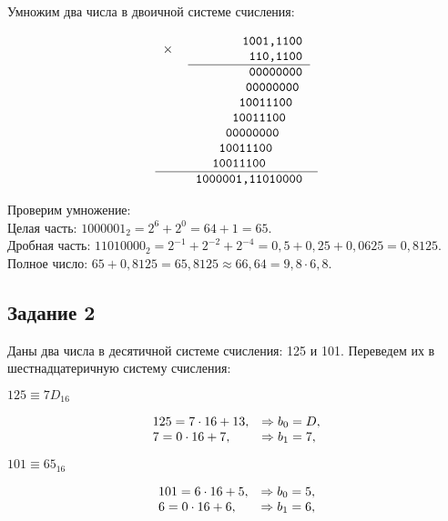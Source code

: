 \documentclass[a4paper,14pt]{extarticle}
\begin{document}
  Умножим два числа в двоичной системе счисления:

  \[
  \begin{tabular}{{c}{c}}
    \texttt{$\times$}&
    \begin{tabular}{c}
      \texttt{~~~~~~~1001,1100}\\
      \texttt{~~~~~~~~110,1100}\\
      \hline
    \end{tabular}\\
    & \texttt{~~~~~~~~00000000}\\
    & \texttt{~~~~~~~00000000~}\\
    & \texttt{~~~~~~10011100~~}\\
    & \texttt{~~~~~10011100~~~}\\
    & \texttt{~~~~00000000~~~~}\\
    & \texttt{~~~10011100~~~~~}\\
    & \texttt{~~10011100~~~~~~}\\
    \hline
    & \texttt{1000001,11010000}
  \end{tabular}
  \]

  Проверим умножение:\\
  Целая часть: $1000001_{2}=2^{6}+2^{0}=64+1=65$. \\
  Дробная часть: $11010000_{2}=2^{-1}+2^{-2}+2^{-4}=0,5+0,25+0,0625=0,8125$.
  Полное число: $65+0,8125=65,8125 \approx 66,64=9,8 \cdot 6,8$.

  \subsection*{Задание 2}

  Даны два числа в десятичной системе счисления: 125 и 101. Переведем их в шестнадцатеричную систему счисления:

  $125 \equiv 7D_{16}$

  \[
  \begin{array}[c]{ll}
    125 = 7 \cdot 16 + 13, &\Rightarrow b_{0} = D,\\
    7 = 0 \cdot 16 + 7, &\Rightarrow b_{1} = 7,\\
  \end{array}
  \]

  \pagebreak

  $101 \equiv 65_{16}$

  \[
  \begin{array}[c]{ll}
    101 = 6 \cdot 16 + 5, &\Rightarrow b_{0} = 5,\\
    6 = 0 \cdot 16 + 6, &\Rightarrow b_{1} = 6,\\
  \end{array}
  \]
\end{document}

